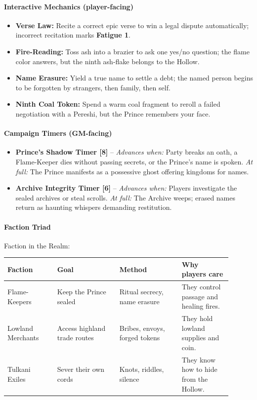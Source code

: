 \paragraph{Interactive Mechanics (player-facing)}
\begin{itemize}
\item[\card{\spadesuit}{1}] \textbf{Verse Law:} Recite a correct epic verse to win a legal dispute automatically; incorrect recitation marks \textbf{Fatigue 1}.
\item[\card{\heartsuit}{2}] \textbf{Fire-Reading:} Toss ash into a brazier to ask one yes/no question; the flame color answers, but the ninth ash-flake belongs to the Hollow.
\item[\card{\clubsuit}{3}] \textbf{Name Erasure:} Yield a true name to settle a debt; the named person begins to be forgotten by strangers, then family, then self.
\item[\card{\diamondsuit}{4}] \textbf{Ninth Coal Token:} Spend a warm coal fragment to reroll a failed negotiation with a Pereshi, but the Prince remembers your face.
\end{itemize}

\paragraph{Campaign Timers (GM-facing)}
\begin{itemize}
\item \textbf{Prince's Shadow Timer [8]} -- \textit{Advances when:} Party breaks an oath, a Flame-Keeper dies without passing secrets, or the Prince's name is spoken. \textit{At full:} The Prince manifests as a possessive ghost offering kingdoms for names.
\item \textbf{Archive Integrity Timer [6]} -- \textit{Advances when:} Players investigate the sealed archives or steal scrolls. \textit{At full:} The Archive weeps; erased names return as haunting whispers demanding restitution.
\end{itemize}

\paragraph{Faction Triad}
Faction in the Realm:
\begin{tabular}{|p{0.2\linewidth}|p{0.25\linewidth}|p{0.25\linewidth}|p{0.2\linewidth}|}
\hline
\textbf{Faction} & \textbf{Goal} & \textbf{Method} & \textbf{Why players care} \\
\hline
Flame-Keepers & Keep the Prince sealed & Ritual secrecy, name erasure & They control passage and healing fires. \\
\hline
Lowland Merchants & Access highland trade routes & Bribes, envoys, forged tokens & They hold lowland supplies and coin. \\
\hline
Tulkani Exiles & Sever their own cords & Knots, riddles, silence & They know how to hide from the Hollow. \\
\hline
\end{tabular}

